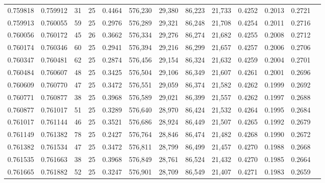 \begin{tabular}{rrrrrrrrrrrrr}
0.759818 & 0.759912 &    31 &  25 &                                     0.4464 & 576,230 &  29,380 &  86,223 &  21,733 & 0.4252 & 0.2013 & 0.2721 \\
0.759913 & 0.760055 &    59 &  25 &                                     0.2976 & 576,289 &  29,321 &  86,248 &  21,708 & 0.4254 & 0.2011 & 0.2716 \\
0.760056 & 0.760172 &    45 &  26 &                                     0.3662 & 576,334 &  29,276 &  86,274 &  21,682 & 0.4255 & 0.2008 & 0.2712 \\
0.760174 & 0.760346 &    60 &  25 &                                     0.2941 & 576,394 &  29,216 &  86,299 &  21,657 & 0.4257 & 0.2006 & 0.2706 \\
0.760347 & 0.760481 &    62 &  25 &                                     0.2874 & 576,456 &  29,154 &  86,324 &  21,632 & 0.4259 & 0.2004 & 0.2701 \\
0.760484 & 0.760607 &    48 &  25 &                                     0.3425 & 576,504 &  29,106 &  86,349 &  21,607 & 0.4261 & 0.2001 & 0.2696 \\
0.760609 & 0.760770 &    47 &  25 &                                     0.3472 & 576,551 &  29,059 &  86,374 &  21,582 & 0.4262 & 0.1999 & 0.2692 \\
0.760771 & 0.760877 &    38 &  25 &                                     0.3968 & 576,589 &  29,021 &  86,399 &  21,557 & 0.4262 & 0.1997 & 0.2688 \\
0.760877 & 0.761017 &    51 &  25 &                                     0.3289 & 576,640 &  28,970 &  86,424 &  21,532 & 0.4264 & 0.1995 & 0.2684 \\
0.761017 & 0.761144 &    46 &  25 &                                     0.3521 & 576,686 &  28,924 &  86,449 &  21,507 & 0.4265 & 0.1992 & 0.2679 \\
0.761149 & 0.761382 &    78 &  25 &                                     0.2427 & 576,764 &  28,846 &  86,474 &  21,482 & 0.4268 & 0.1990 & 0.2672 \\
0.761382 & 0.761534 &    47 &  25 &                                     0.3472 & 576,811 &  28,799 &  86,499 &  21,457 & 0.4270 & 0.1988 & 0.2668 \\
0.761535 & 0.761663 &    38 &  25 &                                     0.3968 & 576,849 &  28,761 &  86,524 &  21,432 & 0.4270 & 0.1985 & 0.2664 \\
0.761665 & 0.761882 &    52 &  25 &                                     0.3247 & 576,901 &  28,709 &  86,549 &  21,407 & 0.4271 & 0.1983 & 0.2659 \\

\end{tabular}
